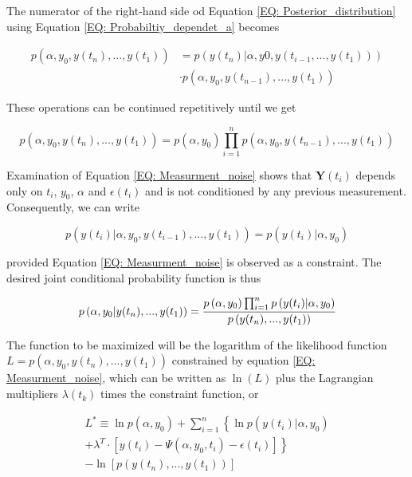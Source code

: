 \documentclass[a4paper,fleqn]{cas-dc}
\begin{document}
The numerator of the right-hand side od Equation \ref{EQ: Posterior_distribution} using Equation \ref{EQ: Probabiltiy_dependet_a} becomes 

\begin{equation}
	\begin{split}
		p\left( \alpha,y_0,y(t_n),...,y(t_1) \right) &= p\left( y(t_n)|\alpha,y0,y(t_{i-1},...,y(t_1)) \right) \\ &\cdot p\left( \alpha,y_0,y(t_{n-1}),...,y(t_1) \right)
	\end{split}
\end{equation}

These operations can be continued repetitively until we get

\begin{equation}
	p\left( \alpha,y_0,y(t_n),...,y(t_1) \right) = p\left( \alpha,y_0 \right) \prod_{i=1}^{n} p\left( \alpha,y_0,y(t_{n-1}),...,y(t_1) \right)
\end{equation}

Examination of Equation \ref{EQ: Measurment_noise} shows that $\textbf{Y}(t_i)$ depends only on $t_i$, $y_0$, $\alpha$ and $\epsilon(t_i)$ and is not conditioned by any previous measurement. Consequently, we can write 

\begin{equation}
	p\left( y(t_i)|\alpha,y_0, y(t_{i-1}),...,y(t_1) \right) = p\left( y(t_i)|\alpha,y_0 \right)
\end{equation}

provided Equation \ref{EQ: Measurment_noise} is observed as a constraint. The desired joint conditional probability function is thus

\begin{equation}
	p\left( \alpha,y_0|y(t_n),...,y(t_1) \right) = \cfrac{p\left( \alpha,y_0 \right) \prod_{i=1}^{n} p\left( y(t_i)|\alpha,y_0 \right) }{p\left( y(t_n),...,y(t_1) \right)}
\end{equation}

The function to be maximized will be the logarithm of the likelihood function $L = p\left( \alpha,y_0, y(t_n),...,y(t_1) \right)$ constrained by equation \ref{EQ: Measurment_noise}, which can be written as $\ln(L)$ plus the Lagrangian multipliers $\lambda(t_k)$ times the constraint function, or

\begin{equation} \label{EQ: MLE_Lagrangian}
	\begin{split}
		L^* \equiv \ln p\left( \alpha,y_0 \right) + \sum_{i=1}^{n} \left\{ \ln p(y(t_i)|\alpha,y_0) \right. \\
		\left. + \lambda^T \cdot \left[ y(t_i) - \Psi\left( \alpha,y_0,t_i \right) - \epsilon(t_i) \right] \right\} \\ - \ln \left[ p\left( y(t_n),...,y(t_1) \right) \right]
	\end{split}
\end{equation}
\end{document}
